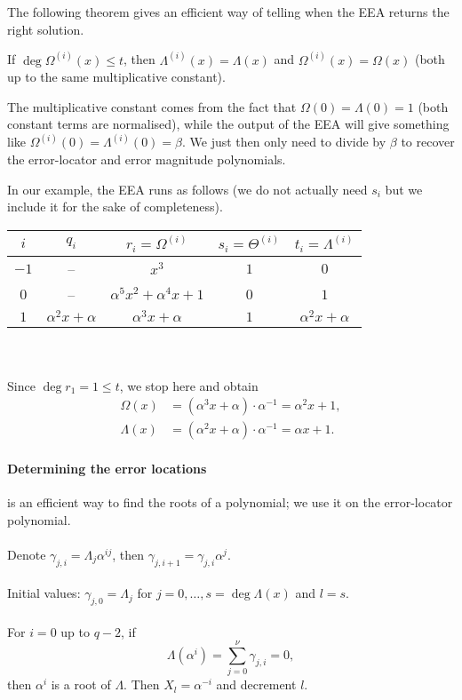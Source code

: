\documentclass[a4paper, 11pt, openany]{book}
\begin{document}
The following theorem gives an efficient way of telling when the EEA returns the right solution.

\begin{theorem}
If $\deg \Omega^{(i)}(x) \le t$, then $\Lambda^{(i)}(x) = \Lambda(x)$ and $\Omega^{(i)}(x) = \Omega(x)$ (both up to the same multiplicative constant).
\end{theorem}

The multiplicative constant comes from the fact that $\Omega(0) = \Lambda(0) = 1$ (both constant terms are normalised), while the output of the EEA will give something like $\Omega^{(i)}(0) = \Lambda^{(i)}(0) = \beta$. We just then only need to divide by $\beta$ to recover the error-locator and error magnitude polynomials.

In our example, the EEA runs as follows (we do not actually need $s_i$ but we include it for the sake of completeness).

\begin{tabular}{c|c|c|c|c}
    $i$ & $q_i$ & $r_i = \Omega^{(i)}$ & $s_i = \Theta^{(i)}$ & $t_i = \Lambda^{(i)}$\\
    \hline
    $-1$ & -- & $x^3$ & $1$ & $0$ \\
    $0$ & -- & $\alpha^5 x^2 + \alpha^4 x + 1$ & $0$ & $1$\\
    $1$ & $\alpha^2 x + \alpha$ & $\alpha^3 x + \alpha$ & $1$ & $\alpha^2 x + \alpha$
\end{tabular}
~\\~\\
Since $\deg r_1 = 1 \le t$, we stop here and obtain
\begin{align*}
    \Omega(x) &= (\alpha^3 x + \alpha) \cdot \alpha^{-1} = \alpha^2x + 1,\\
    \Lambda(x) &= (\alpha^2x + \alpha) \cdot \alpha^{-1} = \alpha x + 1.
\end{align*}


\paragraph{Determining the error locations}
 is an efficient way to find the roots of a polynomial; we use it on the error-locator polynomial.\\
~\\
Denote $\gamma_{j,i} = \Lambda_j \alpha^{ij}$, then $\gamma_{j,i+1} = \gamma_{j,i} \alpha^j$.\\
~\\
Initial values: $\gamma_{j,0} = \Lambda_j$ for $j=0, \dots, s = \deg \Lambda(x)$ and $l=s$.\\
~\\
For $i=0$ up to $q-2$, if
$$
	\Lambda(\alpha^i) = \sum_{j=0}^\nu \gamma_{j,i} = 0,
$$
then $\alpha^i$ is a root of $\Lambda$. Then $X_l = \alpha^{-i}$ and decrement $l$.
\end{document}

